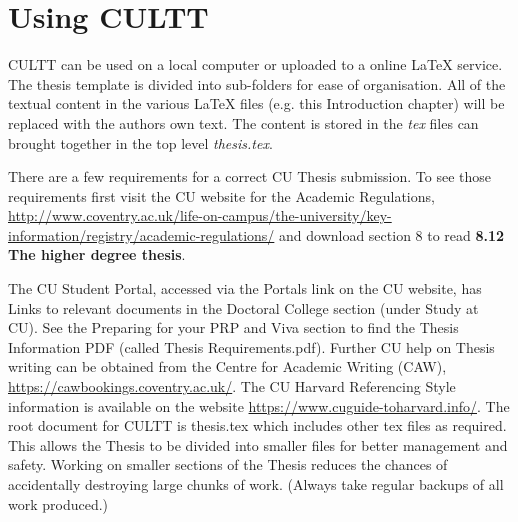 \section{Using CULTT} %

CULTT can be used on a local computer or uploaded to a online \LaTeX{} service. The thesis template is divided into sub-folders for ease of organisation. All of the textual content in the various \LaTeX{} files (e.g. this Introduction chapter) will be replaced with the authors own text. The content is stored in the \textit{tex} files can brought together in the top level \textit{thesis.tex}.

There are a few requirements for a correct CU Thesis submission. To see those requirements first visit the CU website for the Academic Regulations, \url{http://www.coventry.ac.uk/life-on-campus/the-university/key-information/registry/academic-regulations/} and download section 8 to read \textbf{8.12 The higher degree thesis}. 

The CU Student Portal, accessed via the Portals link on the CU website, has Links to relevant documents in the Doctoral College section (under Study at CU). See the Preparing for your PRP and Viva  section to find the Thesis Information PDF (called Thesis Requirements.pdf). Further CU help on Thesis writing can be obtained from the Centre for Academic Writing (CAW), \url{https://cawbookings.coventry.ac.uk/}. The CU Harvard Referencing Style information is available on the website \url{https://www.cuguide-toharvard.info/}. The root document for CULTT is thesis.tex which includes other tex files as required. This allows the Thesis to be divided into smaller files for better management and safety. Working on smaller sections of the Thesis reduces the chances of accidentally destroying large chunks of work. (Always take regular backups of all work produced.)